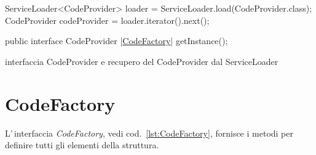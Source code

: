 \documentclass[a4paper,10pt]{report}
\newenvironment{elisting}[1][H]
  {\captionsetup{aboveskip=0pt}\begin{listing}[#1]}
  {\end{listing}%
}
\begin{document}
\begin{elisting}[!htb]
\begin{javacode}
      ServiceLoader<CodeProvider> loader = ServiceLoader.load(CodeProvider.class);
      CodeProvider codeProvider = loader.iterator().next();
\end{javacode}
\vspace*{-1cm}
\begin{javacode}
public interface CodeProvider {
     |\hyperref[lst:CodeFactory]{CodeFactory}| getInstance();
}
\end{javacode}
\caption{interfaccia CodeProvider e recupero del CodeProvider dal ServiceLoader}
\label{lst:CodeProvider}
\end{elisting}


\section{CodeFactory}
L'\,interfaccia \textsl{CodeFactory}, vedi cod.~\ref{lst:CodeFactory}, fornisce 
i metodi per definire tutti gli elementi della struttura.
\end{document}
